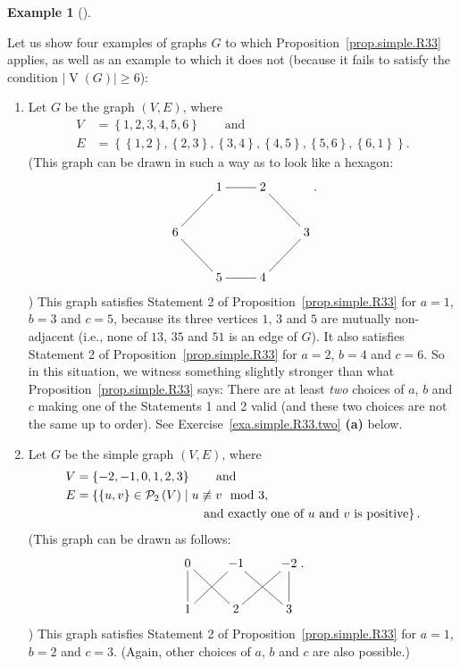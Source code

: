\documentclass[numbers=enddot,12pt,final,onecolumn,notitlepage]{scrartcl}%
\makeatletter
\theoremstyle{definition}
\newtheorem{exam}[theo]{Example}
\newenvironment{example}[1][]
{\begin{exam}[#1]\begin{leftbar}}
{\end{leftbar}\end{exam}}
\newcommand{\powset}[2][]{\ifthenelse{\equal{#2}{}}{\mathcal{P}\left(#1\right)}{\mathcal{P}_{#1}\left(#2\right)}}
\newcommand{\set}[1]{\left\{ #1 \right\}}
\newcommand{\abs}[1]{\left| #1 \right|}
\newcommand{\tup}[1]{\left( #1 \right)}
\newcommand{\verts}[1]{\operatorname{V}\left( #1 \right)}
\newcommand{\are}{\ar@{-}}
\makeatother
\begin{document}
\begin{example} \label{exa.simple.R33}
Let us show four examples of graphs $G$ to which
Proposition~\ref{prop.simple.R33} applies, as well as an example to
which it does not (because it fails to satisfy the condition
$\abs{\verts{G}} \geq 6$):

\begin{enumerate}

\item[\textbf{(a)}] Let $G$ be the graph $\tup{V, E}$, where
\begin{align*}
V &= \set{1, 2, 3, 4, 5, 6} \qquad \text{and} \\
E &= \set{\set{1,2}, \set{2,3}, \set{3,4}, \set{4,5}, \set{5,6},
          \set{6,1}} .
\end{align*}
(This graph can be drawn in such a way as to look like a hexagon:
\begin{align*}
\xymatrix{
& 1 \are[r] & 2 \are[rd] \\
6 \are[ru] & & & 3 \are[ld] \\
& 5 \are[lu] & 4 \are[l]
} .
\end{align*}
)
This graph satisfies Statement 2 of Proposition~\ref{prop.simple.R33}
for $a=1$, $b=3$ and $c=5$,
because its three vertices $1$, $3$ and $5$ are mutually
non-adjacent (i.e., none of $13$, $35$ and $51$ is an edge of $G$).
It also satisfies Statement 2 of Proposition~\ref{prop.simple.R33}
for $a=2$, $b=4$ and $c=6$.
So in this situation, we witness something slightly stronger than what
Proposition~\ref{prop.simple.R33} says: There are at least
\textit{two} choices of $a$, $b$ and $c$ making one of the Statements
1 and 2 valid (and these two choices are not the same up to order).
See Exercise~\ref{exa.simple.R33.two} \textbf{(a)} below.

\item[\textbf{(b)}] Let $G$ be the simple graph $\tup{V, E}$, where
\begin{align*}
V &= \set{-2, -1, 0, 1, 2, 3} \qquad \text{and} \\
E &= \left\{\set{u,v} \in \powset[2]{V} \mid
           u \not\equiv v \mod 3, \right. \\
  & \qquad \qquad \qquad \qquad \qquad
        \left. \text{and exactly one of $u$ and $v$ is positive}
                \right\} .
\end{align*}
(This graph can be drawn as follows:
\begin{align*}
\xymatrix{
0 \are[d] \are[dr] & -1 \are[dl] \are[dr] & -2 \are[dl] \are[d] \\
1 & 2 & 3
} .
\end{align*}
)
This graph satisfies Statement 2 of Proposition~\ref{prop.simple.R33}
for $a=1$, $b=2$ and $c=3$. (Again, other choices of $a$, $b$ and $c$
are also possible.)


\end{enumerate}
\end{example}
\end{document}
